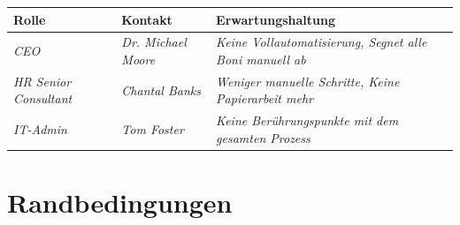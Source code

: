 \documentclass[]{article}
\begin{document}
\begin{longtable}[]{@{}lll@{}}
\toprule
\begin{minipage}[b]{0.23\columnwidth}\raggedright
Rolle\strut
\end{minipage} & \begin{minipage}[b]{0.23\columnwidth}\raggedright
Kontakt\strut
\end{minipage} & \begin{minipage}[b]{0.46\columnwidth}\raggedright
Erwartungshaltung\strut
\end{minipage}\tabularnewline
\midrule
\endhead
\begin{minipage}[t]{0.23\columnwidth}\raggedright
	\emph{CEO}\strut
\end{minipage} & \begin{minipage}[t]{0.23\columnwidth}\raggedright
\emph{Dr. Michael Moore}\strut
\end{minipage} & \begin{minipage}[t]{0.46\columnwidth}\raggedright
\emph{Keine Vollautomatisierung, Segnet alle Boni manuell ab}\strut
\end{minipage}\tabularnewline
\begin{minipage}[t]{0.23\columnwidth}\raggedright
\emph{HR Senior Consultant}\strut
\end{minipage} & \begin{minipage}[t]{0.23\columnwidth}\raggedright
\emph{Chantal Banks}\strut
\end{minipage} & \begin{minipage}[t]{0.46\columnwidth}\raggedright
\emph{Weniger manuelle Schritte, Keine Papierarbeit mehr}\strut
\end{minipage}\tabularnewline
\begin{minipage}[t]{0.23\columnwidth}\raggedright
	\emph{IT-Admin}\strut
\end{minipage} & \begin{minipage}[t]{0.23\columnwidth}\raggedright
	\emph{Tom Foster}\strut
\end{minipage} & \begin{minipage}[t]{0.46\columnwidth}\raggedright
	\emph{Keine Berührungspunkte mit dem gesamten Prozess}\strut
\end{minipage}\tabularnewline
\bottomrule
\end{longtable}

\hypertarget{section-architecture-constraints}{%
\section{Randbedingungen}\label{section-architecture-constraints}}
\end{document}
